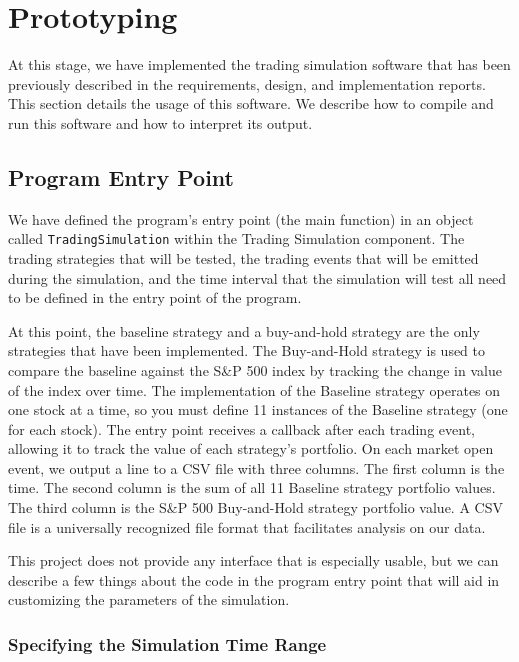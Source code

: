 
\section{Prototyping}

At this stage, we have implemented the trading simulation software that has been previously described in the requirements, design, and implementation reports.
This section details the usage of this software.
We describe how to compile and run this software and how to interpret its output.

\subsection{Program Entry Point}

We have defined the program's entry point (the main function) in an object called \texttt{TradingSimulation} within the Trading Simulation component.
The trading strategies that will be tested, the trading events that will be emitted during the simulation, and the time interval that the simulation will test all need to be defined in the entry point of the program.

At this point, the baseline strategy and a buy-and-hold strategy are the only strategies that have been implemented.
The Buy-and-Hold strategy is used to compare the baseline against the S\&P 500 index by tracking the change in value of the index over time.
The implementation of the Baseline strategy operates on one stock at a time, so you must define 11 instances of the Baseline strategy (one for each stock).
The entry point receives a callback after each trading event, allowing it to track the value of each strategy's portfolio.
On each market open event, we output a line to a CSV file with three columns.
The first column is the time.
The second column is the sum of all 11 Baseline strategy portfolio values.
The third column is the S\&P 500 Buy-and-Hold strategy portfolio value.
A CSV file is a universally recognized file format that facilitates analysis on our data.

This project does not provide any interface that is especially usable, but we can describe a few things about the code in the program entry point that will aid in customizing the parameters of the simulation.

\subsubsection{Specifying the Simulation Time Range}

